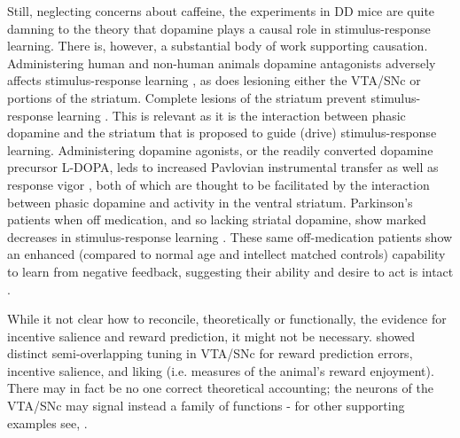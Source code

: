 Still, neglecting concerns about caffeine, the experiments in DD mice are quite damning to the theory that dopamine plays a causal role in stimulus-response learning.  There is, however, a substantial body of work supporting causation.  Administering human and non-human animals dopamine antagonists adversely affects stimulus-response learning \citep{Pizzagalli:2008p6521}, as does lesioning either the VTA/SNc or portions of the striatum.  Complete lesions of the striatum prevent stimulus-response learning \citep{Packard:2002p5074}.  This is relevant as it is the interaction between phasic dopamine and the striatum that is proposed to guide (drive) stimulus-response learning. Administering dopamine agonists, or the readily converted dopamine precursor L-DOPA, leds to increased Pavlovian instrumental transfer as well as response vigor \citep{Winterbauer:2007p6352}, both of which are thought to be facilitated by the interaction between phasic dopamine and activity in the ventral striatum.  Parkinson's patients when off medication, and so lacking striatal dopamine, show marked decreases in stimulus-response learning \citep{Pizzagalli:2008p6521}.  These same off-medication patients show an enhanced (compared to normal age and intellect matched controls) capability to learn from negative feedback, suggesting their ability and desire to act is intact \citep{Frank:2004p4709}.

While it not clear how to reconcile, theoretically or functionally, the evidence for incentive salience and reward prediction, it might not be necessary.  \citet{Smith:2011p8133} showed distinct semi-overlapping tuning in VTA/SNc for reward prediction errors, incentive salience, and liking (i.e. measures of the animal's reward enjoyment). There may in fact be no one correct theoretical accounting; the neurons of the VTA/SNc may signal instead a family of functions - for other supporting examples see, \citet{Ito:2011p8146,Smith:2011p8133, Bornstein:2011p7996,BrombergMartin:2010p7218,Matsumoto:2009p7219}.


